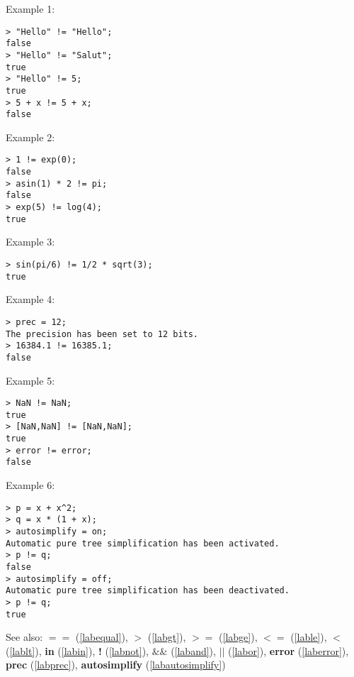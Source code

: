 \noindent Example 1: 
\begin{center}\begin{minipage}{15cm}\begin{Verbatim}[frame=single]
> "Hello" != "Hello";
false
> "Hello" != "Salut";
true
> "Hello" != 5;
true
> 5 + x != 5 + x;
false
\end{Verbatim}
\end{minipage}\end{center}
\noindent Example 2: 
\begin{center}\begin{minipage}{15cm}\begin{Verbatim}[frame=single]
> 1 != exp(0);
false
> asin(1) * 2 != pi;
false
> exp(5) != log(4);
true
\end{Verbatim}
\end{minipage}\end{center}
\noindent Example 3: 
\begin{center}\begin{minipage}{15cm}\begin{Verbatim}[frame=single]
> sin(pi/6) != 1/2 * sqrt(3);
true
\end{Verbatim}
\end{minipage}\end{center}
\noindent Example 4: 
\begin{center}\begin{minipage}{15cm}\begin{Verbatim}[frame=single]
> prec = 12;
The precision has been set to 12 bits.
> 16384.1 != 16385.1;
false
\end{Verbatim}
\end{minipage}\end{center}
\noindent Example 5: 
\begin{center}\begin{minipage}{15cm}\begin{Verbatim}[frame=single]
> NaN != NaN;
true
> [NaN,NaN] != [NaN,NaN];
true
> error != error;
false
\end{Verbatim}
\end{minipage}\end{center}
\noindent Example 6: 
\begin{center}\begin{minipage}{15cm}\begin{Verbatim}[frame=single]
> p = x + x^2;
> q = x * (1 + x);
> autosimplify = on;
Automatic pure tree simplification has been activated.
> p != q;
false
> autosimplify = off;
Automatic pure tree simplification has been deactivated.
> p != q;
true
\end{Verbatim}
\end{minipage}\end{center}
See also: \textbf{$==$} (\ref{labequal}), \textbf{$>$} (\ref{labgt}), \textbf{$>=$} (\ref{labge}), \textbf{$<=$} (\ref{lable}), \textbf{$<$} (\ref{lablt}), \textbf{in} (\ref{labin}), \textbf{!} (\ref{labnot}), \textbf{$\&\&$} (\ref{laband}), \textbf{$||$} (\ref{labor}), \textbf{error} (\ref{laberror}), \textbf{prec} (\ref{labprec}), \textbf{autosimplify} (\ref{labautosimplify})
